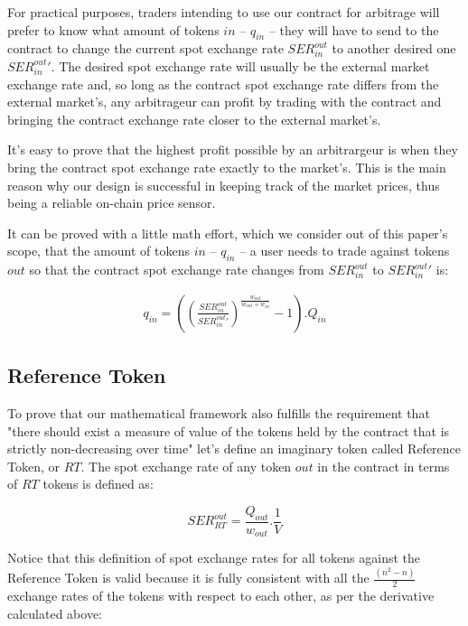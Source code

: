 \documentclass[11pt]{amsart}
\begin{document}
For practical purposes, traders intending to use our contract for arbitrage will prefer to know what amount of tokens $in$ -- $q_{in}$ -- they will have to send to the contract to change the current spot exchange rate $SER^{out}_{in}$ to another desired one $SER^{out}_{in}'$. The desired spot exchange rate will usually be the external market exchange rate and, so long as the contract spot exchange rate differs from the external market's, any arbitrageur can profit by trading with the contract and bringing the contract exchange rate closer to the external market's. 

It's easy to prove that the highest profit possible by an arbitrargeur is when they bring the contract spot exchange rate exactly to the market's. This is the main reason why our design is successful in keeping track of the market prices, thus being a reliable on-chain price sensor.

It can be proved with a little math effort, which we consider out of this paper's scope, that the amount of tokens $in$ -- $q_{in}$ -- a user needs to trade against tokens $out$ so that the contract spot exchange rate changes from $SER^{out}_{in}$ to $SER^{out}_{in}'$ is:

\begin{equation}
\begin{gathered}
q_{in} = \left(\left(\frac{SER^{out}_{in}}{SER^{out}_{in}'}\right)^\frac{w_{out}}{w_{out}+w_{in}} - 1 \right).Q_{in}
\end{gathered}
\end{equation}

\subsection{Reference Token}

To prove that our mathematical framework also fulfills the requirement that "there should exist a measure of value of the tokens held by the contract that is strictly non-decreasing over time" let's define an imaginary token called Reference Token, or $RT$. The spot exchange rate of any token $out$ in the contract in terms of $RT$ tokens is defined as:

\begin{equation}
SER^{out}_{RT} = \frac{Q_{out}}{w_{out}}.\frac{1}{V}
\end{equation}

Notice that this definition of spot exchange rates for all tokens against the Reference Token is valid because it is fully consistent with all the $\frac{(n^2 - n)}{2}$ exchange rates of the tokens with respect to each other, as per the derivative calculated above:
\end{document}

